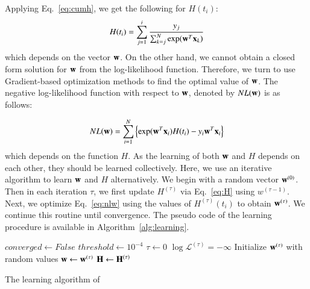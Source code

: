 Applying Eq.~\ref{eq:cumh}, we get the following for $H(t_i)$:
\begin{equation}\label{eq:H}
H(t_i)=\sum_{j=1}^{i}\frac{y_j}{\sum_{k=j}^{N}\exp(\mb{w}^T\mb{x}_k)}
\end{equation}
which depends on the vector $\mathbf{w}$. On the other hand, we cannot obtain a closed form solution for $\mathbf{w}$ from the log-likelihood function. Therefore, we turn to use Gradient-based optimization methods to find the optimal value of $\mathbf{w}$. The negative log-likelihood function with respect to $\mathbf{w}$, denoted by $NL(\mathbf{w})$ is as follows:

\begin{equation}\label{eq:nlw}
NL(\mb{w})=\sum_{i=1}^{N}\left\lbrace\exp(\mb{w}^T\mb{x}_i)H(t_i)-y_i\mb{w}^T\mb{x}_i\right\rbrace
\end{equation}
which depends on the function $H$. As the learning of both $\mathbf{w}$ and $H$ depends on each other, they should be learned collectively. Here, we use an iterative algorithm to learn $\mathbf{w}$ and $H$ alternatively. We begin with a random vector $\mathbf{w}^{(0)}$. Then in each iteration $\tau$, we first update $H^{(\tau)}$ via Eq.~\ref{eq:H} using $w^{(\tau-1)}$. Next, we optimize Eq.~\ref{eq:nlw} using the values of $H^{(\tau)}(t_i)$ to obtain $\mathbf{w}^{(\tau)}$. We continue this routine until convergence. The pseudo code of the learning procedure is available in Algorithm~\ref{alg:learning}.

\begin{algorithm}[t]
	\small
	\SetAlgoLined
	$converged\leftarrow False$\;
	$threshold\leftarrow10^{-4}$\;
	$\tau\leftarrow 0$\;
	$\log\mathcal{L}^{(\tau)}=-\infty$\;
	Initialize $\mathbf{w}^{(\tau)}$ with random values\;
	$\mathbf{w}\leftarrow \mathbf{w}^{(\tau)}$\;
	$\mathbf{H}\leftarrow \mathbf{H}^{(\tau)}$\;
	\caption{The learning algorithm of \npglm}
	\label{alg:learning}
\end{algorithm}


